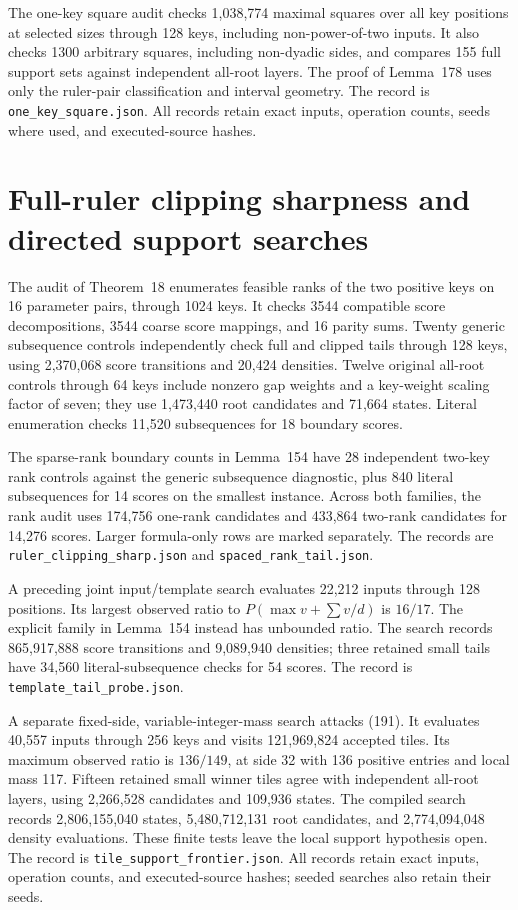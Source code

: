 \documentclass[11pt]{article}
\begin{document}
The one-key square audit checks 1,038,774 maximal squares over all key
positions at selected sizes through 128 keys, including non-power-of-two
inputs. It also checks 1300 arbitrary squares, including non-dyadic sides,
and compares 155 full support sets against independent all-root layers.
The proof of Lemma~178 uses only the ruler-pair
classification and interval geometry. The record is
\texttt{one\_key\_square.json}. All records retain exact inputs,
operation counts, seeds where used, and executed-source hashes.

\section{Full-ruler clipping sharpness and directed support searches}
\label{app:ruler-clipping-sharp}
The audit of Theorem~18 enumerates feasible
ranks of the two positive keys on 16 parameter pairs, through 1024 keys.
It checks 3544 compatible score decompositions, 3544 coarse score mappings,
and 16 parity sums. Twenty generic subsequence controls independently check
full and clipped tails through 128 keys, using 2,370,068 score transitions
and 20,424 densities. Twelve original all-root controls through 64 keys
include nonzero gap weights and a key-weight scaling factor of seven;
they use 1,473,440 root candidates and 71,664 states. Literal enumeration
checks 11,520 subsequences for 18 boundary scores.

The sparse-rank boundary counts in Lemma~154 have
28 independent two-key rank controls against the generic subsequence
diagnostic, plus 840 literal subsequences for 14 scores on the smallest
instance. Across both families, the rank audit uses 174,756 one-rank
candidates and 433,864 two-rank candidates for 14,276 scores. Larger
formula-only rows are marked separately. The records are
\texttt{ruler\_clipping\_sharp.json} and \texttt{spaced\_rank\_tail.json}.

A preceding joint input/template search evaluates 22,212 inputs through
128 positions. Its largest observed ratio to
$P(\max v+\sum v/d)$ is $16/17$. The explicit family in
Lemma~154 instead has unbounded ratio.
The search records 865,917,888 score transitions and 9,089,940 densities;
three retained small tails have 34,560 literal-subsequence checks for
54 scores. The record is \texttt{template\_tail\_probe.json}.

A separate fixed-side, variable-integer-mass search attacks
(191). It evaluates 40,557 inputs through
256 keys and visits 121,969,824 accepted tiles. Its maximum observed
ratio is $136/149$, at side 32 with 136 positive entries and local mass
117. Fifteen retained small winner tiles agree with independent all-root
layers, using 2,266,528 candidates and 109,936 states. The compiled search
records 2,806,155,040 states, 5,480,712,131 root candidates, and
2,774,094,048 density evaluations. These finite tests leave the local
support hypothesis open. The record is \texttt{tile\_support\_frontier.json}.
All records retain exact inputs, operation counts, and executed-source
hashes; seeded searches also retain their seeds.
\end{document}
